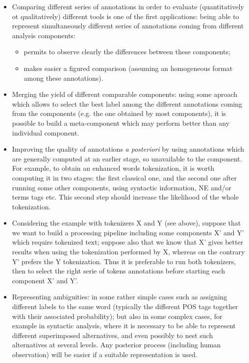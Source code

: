 \documentclass{article}
\newenvironment{xitemize}{
\begin{itemize}
  \setlength{\itemsep}{.3\baselineskip}
  \setlength{\topsep}{0pt}
  \setlength{\parskip}{0pt}
  \setlength{\parsep}{0pt}
}{\end{itemize}}
\begin{document}
\begin{xitemize}
\item Comparing different series of annotations in order to evaluate (quantitatively ot qualitatively) different tools is one of the first applications: being able to represent simultaneously different series of annotations coming from different analysis components:
\begin{xitemize}
\item permits to observe clearly the differences between these components;
\item makes easier a figured comparison (assuming an homogeneous format among these annotations).
\end{xitemize}
\item Merging the yield of different comparable components: using some aproach which allows to select the best label among the different annotations coming from the components (e.g. the one obtained by most components), it is possible to build a meta-component which may perform better than any individual component.
\item Improving the quality of annotations \textit{a posteriori} by using annotations which are generally computed at an earlier stage, so unavailable to the component. For example, to obtain an enhanced  words tokenization, it is worth computing it in two stages: the first classical one, and the second one after running some other components, using syntactic information, NE and/or terms tags etc. This second step should increase the likelihood of the whole tokenization.
\item Considering the example with tokenizers X and Y (see above), suppose that we want to build a processing pipeline including some components X' and Y' which require tokenized text; suppose also that we know that X' gives better results when using the tokenization performed by X, whereas on the contrary Y' prefers the Y tokenization. Thus it is preferable to run both tokenizers, then to select the right serie of tokens annotations before starting each component X' and Y'.
\item Representing ambiguities: in some rather simple cases such as assigning different labels to the same word (typically the different POS tags together with their associated probability); but also in some complex cases, for example in syntactic analysis, where it is necessary to be able to represent different superimposed alternatives, and even possibly to nest such alternatives at several levels. Any posterior process (including human observation) will be easier if a suitable representation is used. 
\end{xitemize}
\end{document}
